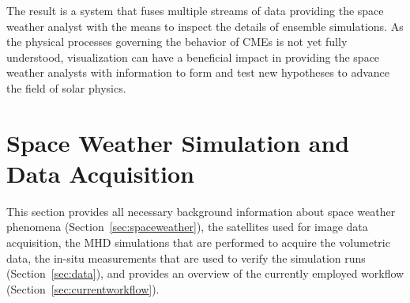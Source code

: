 \documentclass[journal]{vgtc}                %
\begin{document}
The result is a system that fuses multiple streams of data providing the space weather analyst with the means to inspect the details of ensemble simulations. As the physical processes governing the behavior of CMEs is not yet fully understood, visualization can have a beneficial impact in providing the space weather analysts with information to form and test new hypotheses to advance the field of solar physics.  

\section{Space Weather Simulation and Data Acquisition}
This section provides all necessary background information about space weather phenomena (Section~\ref{sec:spaceweather}), the satellites used for image data acquisition, the MHD simulations that are performed to acquire the volumetric data, the in-situ measurements that are used to verify the simulation runs (Section~\ref{sec:data}), and provides an overview of the currently employed workflow (Section~\ref{sec:currentworkflow}).
\end{document}

